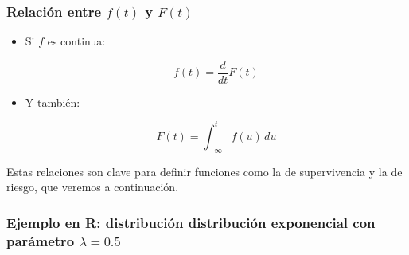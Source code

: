 \documentclass[
  letterpaper,
  ignorenonframetext,
  DIV=11,
  numbers=noendperiod]{scrartcl}
\begin{document}
\subsubsection{\texorpdfstring{Relación entre \(f(t)\) y
\(F(t)\)}{Relación entre f(t) y F(t)}}\label{relaciuxf3n-entre-ft-y-ft}

\begin{itemize}
\item
  Si \(f\) es continua:

  \[
  f(t) = \frac{d}{dt} F(t)
  \]
\item
  Y también:

  \[
  F(t) = \int_{-\infty}^t f(u) \, du
  \]
\end{itemize}

Estas relaciones son clave para definir funciones como la de
supervivencia y la de riesgo, que veremos a continuación.

\subsubsection{\texorpdfstring{Ejemplo en R: distribución distribución
exponencial con parámetro
\(\lambda = 0.5\)}{Ejemplo en R: distribución distribución exponencial con parámetro \textbackslash lambda = 0.5}}\label{ejemplo-en-r-distribuciuxf3n-distribuciuxf3n-exponencial-con-paruxe1metro-lambda-0.5}
\end{document}
